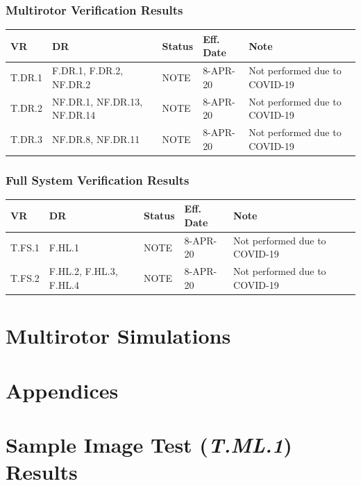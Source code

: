 \documentclass[10pt,letterpaper]{article}
\begin{document}
\subsubsection{Multirotor Verification Results}
\begin{table}[H]
	\centering
	\begin{tabular}{lllll}
	\hline
	\textbf{VR} & \textbf{DR} & \textbf{Status} & \textbf{Eff. Date} & \textbf{Note}\\
	\hline
    T.DR.1 & F.DR.1, F.DR.2, NF.DR.2 & NOTE & 8-APR-20 & Not performed due to COVID-19\\
    T.DR.2 & NF.DR.1, NF.DR.13, NF.DR.14 & NOTE   & 8-APR-20 & Not performed due to COVID-19\\
	T.DR.3 & NF.DR.8, NF.DR.11 & NOTE & 8-APR-20 & Not performed due to COVID-19\\
	\hline
	\end{tabular}
\end{table}

\subsubsection{Full System Verification Results}
\begin{table}[H]
	\centering
	\begin{tabular}{lllll}
	\hline
	\textbf{VR} & \textbf{DR} & \textbf{Status} & \textbf{Eff. Date} & \textbf{Note}\\
	\hline
    T.FS.1 & F.HL.1  & NOTE & 8-APR-20 & Not performed due to COVID-19\\
	T.FS.2 & F.HL.2, F.HL.3, F.HL.4 & NOTE & 8-APR-20 & Not performed due to COVID-19\\
	\hline
	\end{tabular}
\end{table}

\section{Multirotor Simulations}
\label{mr_sims}


\clearpage
{}



 \clearpage
 \appendix
 \section*{Appendices}
 \section{Sample Image Test (\textit{T.ML.1}) Results}\label{appendix:T.ML.1}
 
\end{document}
